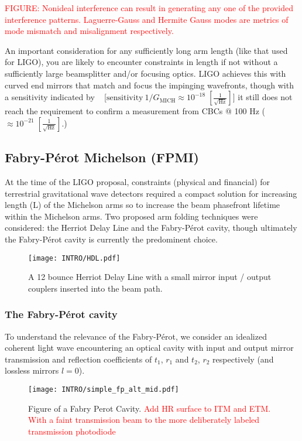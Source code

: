 \textcolor{red}{FIGURE: Nonideal interference can result in generating any one of the provided interference patterns. Laguerre-Gauss and Hermite Gauss modes are metrics of mode mismatch and misalignment respectively.}

An important consideration for any sufficiently long arm length (like that used for LIGO), you are likely to encounter constraints in length if not without a sufficiently large beamsplitter and/or focusing optics. LIGO achieves this with curved end mirrors that match and focus the impinging wavefronts, though with a sensitivity indicated by ~\cite{} [$\mathrm{sensitivity} ~ 1/G_\mathrm{MICH} \approx 10^{-18} \; [\frac{1}{\sqrt{\mathrm{Hz}}}]]$ it still does not reach the requirement to confirm a measurement from CBCs @ 100 Hz ($\approx 10^{-21} \; [\frac{1}{\sqrt{\mathrm{Hz}}}]$.)

\subsection{Fabry-P\'{e}rot Michelson (FPMI)}
At the time of the LIGO proposal, constraints (physical and financial) for terrestrial gravitational wave detectors required a compact solution for increasing length (L) of the Michelson arms so to increase the beam phasefront lifetime within the Michelson arms. Two proposed arm folding techniques were considered: the Herriot Delay Line and the Fabry-P\'{e}rot cavity, though ultimately the Fabry-P\'{e}rot cavity is currently the predominent choice.

\begin{figure}[ht!]
	\centering
	\texttt{[image: INTRO/HDL.pdf]}
	\caption{A 12 bounce Herriot Delay Line with a small mirror input / output couplers inserted into the beam path.}
	\label{fig:hdl_cav}
\end{figure}


\subsubsection{The Fabry-P\'{e}rot cavity}
\label{section:FPC}
To understand the relevance of the Fabry-P\'{e}rot, we consider an idealized coherent light wave encountering an optical cavity with input and output mirror transmission and reflection coefficients of $t_1$, $r_1$ and $t_2$, $r_2$ respectively (and lossless mirrors $l=0$).

\begin{figure}[ht!]
	\centering
	\texttt{[image: INTRO/simple\_fp\_alt\_mid.pdf]}
	\caption{Figure of a Fabry Perot Cavity. \textcolor{red}{Add HR surface to ITM and ETM. With a faint transmission beam to the more deliberately labeled transmission photodiode}}
	\label{fig:fp_cav}
\end{figure}


